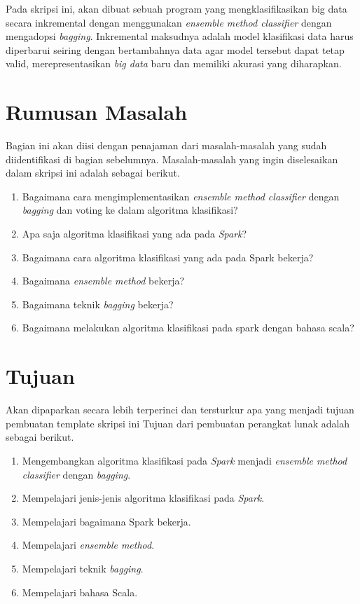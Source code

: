 Pada skripsi ini, akan dibuat sebuah program yang mengklasifikasikan big data secara inkremental dengan menggunakan \textit{ensemble method classifier} dengan mengadopsi \textit{bagging}. Inkremental maksudnya adalah model klasifikasi data harus diperbarui seiring dengan bertambahnya data agar model tersebut dapat tetap valid, merepresentasikan \textit{big data} baru dan memiliki akurasi yang diharapkan.

\section{Rumusan Masalah}
\label{sec:rumusan}
Bagian ini akan diisi dengan penajaman dari masalah-masalah yang sudah diidentifikasi di bagian sebelumnya. 
Masalah-masalah yang ingin diselesaikan dalam skripsi ini adalah sebagai berikut.
\begin{enumerate}
\item Bagaimana cara mengimplementasikan \textit{ensemble method classifier} dengan \textit{bagging} dan voting ke dalam algoritma klasifikasi?
\item Apa saja algoritma klasifikasi yang ada pada \textit{Spark}?
\item Bagaimana cara algoritma klasifikasi yang ada pada Spark bekerja?
\item Bagaimana \textit{ensemble method} bekerja?
\item Bagaimana teknik \textit{bagging} bekerja?\\
\item Bagaimana melakukan algoritma klasifikasi pada spark dengan bahasa scala?
\end{enumerate}


\section{Tujuan}
\label{sec:tujuan}
Akan dipaparkan secara lebih terperinci dan tersturkur apa yang menjadi tujuan pembuatan template skripsi ini
Tujuan dari pembuatan perangkat lunak adalah sebagai berikut.
\begin{enumerate}
\item Mengembangkan algoritma klasifikasi pada \textit{Spark} menjadi \textit{ensemble method classifier} dengan \textit{bagging}.
\item Mempelajari jenis-jenis algoritma klasifikasi pada \textit{Spark}.
\item Mempelajari bagaimana Spark bekerja.
\item Mempelajari \textit{ensemble method}.
\item Mempelajari teknik \textit{bagging}.
\item Mempelajari bahasa Scala.
\end{enumerate}


